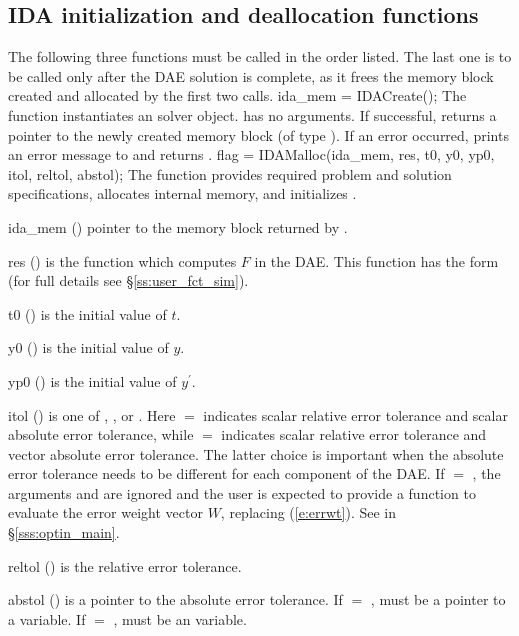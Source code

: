\subsection{IDA initialization and deallocation functions}
\label{sss:idamalloc}
The following three functions must be called in the order listed. The last one
is to be called only after the DAE solution is complete, as it frees the {\ida}
memory block created and allocated by the first two calls.
{
  ida\_mem = IDACreate();
}
{
  The function  instantiates an {\ida} solver object.
}
{
   has no arguments.
}
{
  If successful,  returns a pointer to the newly created 
  {\ida} memory block (of type ).
  If an error occurred,  prints an error message to 
  and returns .
}
{}
{
flag = IDAMalloc(ida\_mem, res, t0, y0, yp0, itol, reltol, abstol);
}
{
  The function  provides required problem and solution
  specifications, allocates internal memory, and initializes {\ida}.
}
{
  \begin{args}
  \item[ida\_mem] ()
    pointer to the {\ida} memory block returned by .
  \item[res] ()
    is the {\C} function which computes $F$ in the DAE. This function has the form 
     (for full details see
    \S\ref{ss:user_fct_sim}).
  \item[t0] ()
    is the initial value of $t$.
  \item[y0] ()
    is the initial value of $y$. 
  \item[yp0] ()
    is the initial value of $y^\prime$. 
  \item[itol] () 
    is one of , , or .  Here 
    $=$  indicates scalar relative error tolerance and scalar
    absolute error tolerance, while  $=$  indicates
    scalar relative error tolerance and vector absolute error tolerance. 
    The latter choice is important when the absolute error tolerance needs to
    be different for each component of the DAE. 
    If  $=$ , the arguments  and  are
    ignored and the user is expected to provide a function to evaluate the error
    weight vector $W$, replacing (\ref{e:errwt}). See  in
    \S\ref{sss:optin_main}.
  \item[reltol] ()
    is the relative error tolerance.
  \item[abstol] ()
    is a pointer to the absolute error tolerance. If  $=$ ,
     must be a pointer to a  variable. If 
    $=$ ,  must be an  variable.
  \end{args}
}
